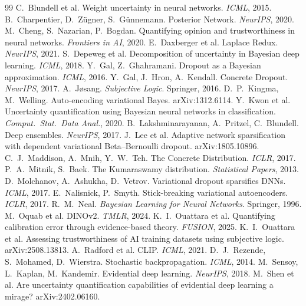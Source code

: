 \documentclass[11pt]{article}
\begin{document}
\begin{thebibliography}{99}\small
{} C.~Blundell et al. Weight uncertainty in neural networks. \emph{ICML}, 2015.
 B.~Charpentier, D.~Z\"ugner, S.~G\"unnemann. Posterior Network. \emph{NeurIPS}, 2020.
 M.~Cheng, S.~Nazarian, P.~Bogdan. Quantifying opinion and trustworthiness in neural networks. \emph{Frontiers in AI}, 2020.
 E.~Daxberger et al. Laplace Redux. \emph{NeurIPS}, 2021.
 S.~Depeweg et al. Decomposition of uncertainty in Bayesian deep learning. \emph{ICML}, 2018. %
 Y.~Gal, Z.~Ghahramani. Dropout as a Bayesian approximation. \emph{ICML}, 2016.
 Y.~Gal, J.~Hron, A.~Kendall. Concrete Dropout. \emph{NeurIPS}, 2017.
 A.~J{\o}sang. \emph{Subjective Logic}. Springer, 2016.
 D.~P.~Kingma, M.~Welling. Auto-encoding variational Bayes. arXiv:1312.6114.
 Y.~Kwon et al. Uncertainty quantification using Bayesian neural networks in classification. \emph{Comput.\ Stat.\ Data Anal.}, 2020. %
 B.~Lakshminarayanan, A.~Pritzel, C.~Blundell. Deep ensembles. \emph{NeurIPS}, 2017.
 J.~Lee et al. Adaptive network sparsification with dependent variational Beta--Bernoulli dropout. arXiv:1805.10896.
 C.~J.~Maddison, A.~Mnih, Y.~W.~Teh. The Concrete Distribution. \emph{ICLR}, 2017.
 P.~A.~Mitnik, S.~Baek. The Kumaraswamy distribution. \emph{Statistical Papers}, 2013.
 D.~Molchanov, A.~Ashukha, D.~Vetrov. Variational dropout sparsifies DNNs. \emph{ICML}, 2017.
 E.~Nalisnick, P.~Smyth. Stick-breaking variational autoencoders. \emph{ICLR}, 2017.
 R.~M.~Neal. \emph{Bayesian Learning for Neural Networks}. Springer, 1996.
 M.~Oquab et al. DINOv2. \emph{TMLR}, 2024. %
 K.~I.~Ouattara et al. Quantifying calibration error through evidence-based theory. \emph{FUSION}, 2025.
 K.~I.~Ouattara et al. Assessing trustworthiness of AI training datasets using subjective logic. arXiv:2508.13813.
 A.~Radford et al. CLIP. \emph{ICML}, 2021. %
 D.~J.~Rezende, S.~Mohamed, D.~Wierstra. Stochastic backpropagation. \emph{ICML}, 2014.
 M.~Sensoy, L.~Kaplan, M.~Kandemir. Evidential deep learning. \emph{NeurIPS}, 2018.
 M.~Shen et al. Are uncertainty quantification capabilities of evidential deep learning a mirage? arXiv:2402.06160.
\end{thebibliography}
\end{document}
